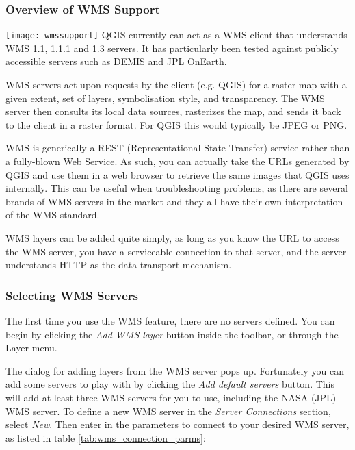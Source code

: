 \subsubsection{Overview of WMS Support}\label{sec:ogc-wms-about}

\texttt{[image: wmssupport]}
QGIS currently can act as a WMS client that understands WMS 1.1, 1.1.1 and 1.3
servers.  It has particularly been tested against publicly accessible servers
such as DEMIS and JPL OnEarth.

WMS servers act upon requests by the client (e.g. QGIS) for a raster map with
a given extent, set of layers, symbolisation style, and transparency.  The WMS
server then consults its local data sources, rasterizes the map, and sends
it back to the client in a raster format.  For QGIS this would typically
be JPEG or PNG.

WMS is generically a REST (Representational State Transfer) service rather than
a fully-blown Web Service.  As such, you can actually take the URLs generated by
QGIS and use them in a web browser to retrieve the same images that QGIS uses
internally.  This can be useful when troubleshooting problems, as there are
several brands of WMS servers in the market and they all have their own
interpretation of the WMS standard.

WMS layers can be added quite simply, as long as you know the URL to access
the WMS server, you have a serviceable connection to that server, and the
server understands HTTP as the data transport mechanism.

\subsubsection{Selecting WMS Servers}\label{sec:ogc-wms-servers}

The first time you use the WMS feature, there are no servers defined. You 
can begin by clicking the \textsl{Add WMS layer} button inside the toolbar, 
or through the Layer menu.

The dialog for adding layers from the WMS server pops up. Fortunately you can 
add some servers to play with by clicking the \textsl{Add default servers} 
button. This will add at least three WMS servers for you to use, including the NASA (JPL) 
WMS server. To define a new WMS server in the \textsl{Server Connections} section, 
select \textsl{New}. Then enter in the parameters to connect to your desired
WMS server, as listed in table \ref{tab:wms_connection_parms}:

